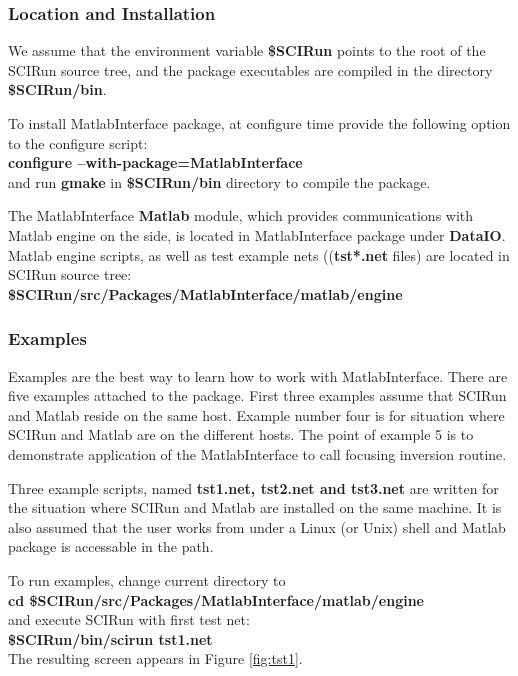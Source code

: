 \subsubsection{Location and Installation} \indent

We assume that the environment variable {\bf \$SCIRun} points to the root
of the SCIRun source tree, and the package executables are compiled in the
directory {\bf \$SCIRun/bin}.

To install MatlabInterface package, at configure time provide the
following option to the configure script: \\
{\bf configure --with-package=MatlabInterface} \\
and run {\bf gmake } in {\bf \$SCIRun/bin} directory
to compile the package. 

The MatlabInterface {\bf Matlab} module, which provides communications with 
Matlab engine on the \sr{} side, is located in MatlabInterface 
package under {\bf DataIO}. Matlab engine scripts, as well as test 
example nets (({\bf tst*.net} files) are located in SCIRun source tree: \\
{\bf \$SCIRun/src/Packages/MatlabInterface/matlab/engine }\\

\subsubsection{Examples} \indent

Examples are the best way to learn how to work with MatlabInterface.
There are five examples attached to the package. First three
examples assume that SCIRun and Matlab reside on the same host.
Example number four is for situation where SCIRun and Matlab are
on the different hosts. The point of example 5 is to demonstrate
application of the MatlabInterface to call focusing inversion routine.

Three example scripts, named {\bf tst1.net, tst2.net and tst3.net}
are written for the situation where SCIRun and 
Matlab are installed on the same machine. 
It is also assumed that the user works from under  a Linux (or Unix)
shell and Matlab package is accessable in the path. 

To run examples, change current directory to \\
{\bf cd \$SCIRun/src/Packages/MatlabInterface/matlab/engine } \\
and execute SCIRun with first test net: \\
{\bf \$SCIRun/bin/scirun  tst1.net} \\
The resulting screen appears in Figure \ref{fig:tst1}.

